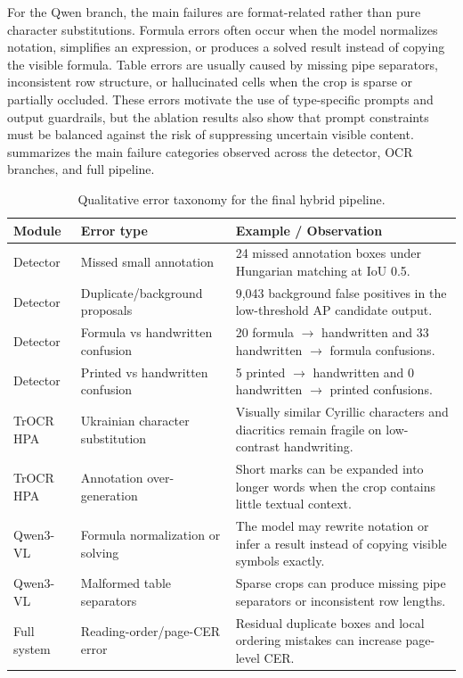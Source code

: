 \documentclass[runningheads]{llncs}
\begin{document}
For the Qwen branch, the main failures are format-related rather than pure character substitutions. Formula errors often occur when the model normalizes notation, simplifies an expression, or produces a solved result instead of copying the visible formula. Table errors are usually caused by missing pipe separators, inconsistent row structure, or hallucinated cells when the crop is sparse or partially occluded. These errors motivate the use of type-specific prompts and output guardrails, but the ablation results also show that prompt constraints must be balanced against the risk of suppressing uncertain visible content.  summarizes the main failure categories observed across the detector, OCR branches, and full pipeline.

\begin{table}[tb]
  \caption{Qualitative error taxonomy for the final hybrid pipeline.}
  \label{tab:error-taxonomy}
  \centering
  \begingroup
  \scriptsize
  \setlength{\tabcolsep}{3pt}
  \renewcommand{\arraystretch}{1.05}
  \begin{tabularx}{\linewidth}{@{}lYY@{}}
    \toprule
    Module & Error type & Example / Observation \\
    \midrule
    Detector & Missed small annotation & 24 missed annotation boxes under Hungarian matching at IoU 0.5. \\
    Detector & Duplicate/background proposals & 9,043 background false positives in the low-threshold AP candidate output. \\
    Detector & Formula vs handwritten confusion & 20 formula $\rightarrow$ handwritten and 33 handwritten $\rightarrow$ formula confusions. \\
    Detector & Printed vs handwritten confusion & 5 printed $\rightarrow$ handwritten and 0 handwritten $\rightarrow$ printed confusions. \\
    TrOCR HPA & Ukrainian character substitution & Visually similar Cyrillic characters and diacritics remain fragile on low-contrast handwriting. \\
    TrOCR HPA & Annotation over-generation & Short marks can be expanded into longer words when the crop contains little textual context. \\
    Qwen3-VL & Formula normalization or solving & The model may rewrite notation or infer a result instead of copying visible symbols exactly. \\
    Qwen3-VL & Malformed table separators & Sparse crops can produce missing pipe separators or inconsistent row lengths. \\
    Full system & Reading-order/page-CER error & Residual duplicate boxes and local ordering mistakes can increase page-level CER. \\
    \bottomrule
  \end{tabularx}
  \endgroup
\end{table}
\end{document}
